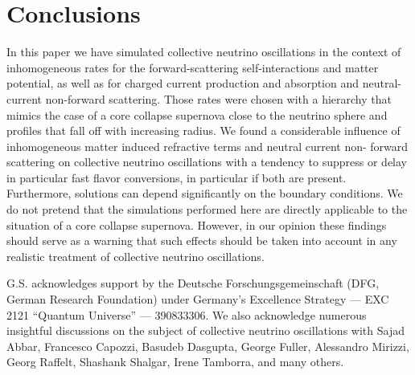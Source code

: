 \documentclass[prd,aps]{revtex4-2}
\begin{document}
\section{Conclusions}\label{sec:sec5}
In this paper we have simulated collective neutrino oscillations in the context of inhomogeneous rates for the
forward-scattering self-interactions and matter potential, as well as for charged current production
and absorption and neutral-current non-forward scattering. Those rates were chosen with a hierarchy that mimics
the case of a core collapse supernova close to the neutrino sphere and profiles that fall off with increasing radius.
We found a considerable influence of inhomogeneous matter induced refractive terms and neutral current non-
forward scattering on collective neutrino oscillations with a tendency to suppress or delay in particular fast flavor 
conversions, in particular if both are present. Furthermore, solutions can depend significantly on the boundary
conditions. We do not pretend that the simulations performed here are directly 
applicable to the situation of a core collapse supernova.
However, in our opinion these findings should serve as a warning that such effects should be taken into account in 
any realistic treatment of collective neutrino oscillations.

\begin{acknowledgments}
G.S. acknowledges support by the Deutsche Forschungsgemeinschaft (DFG, German Research Foundation) under Germany’s Excellence Strategy — EXC 2121 “Quantum Universe” — 390833306. We also acknowledge numerous insightful discussions on the subject of
collective neutrino oscillations with Sajad Abbar, Francesco Capozzi, Basudeb Dasgupta, George Fuller, Alessandro Mirizzi, Georg Raffelt,
Shashank Shalgar, Irene Tamborra, and many others.
\end{acknowledgments}

%


\end{document}
